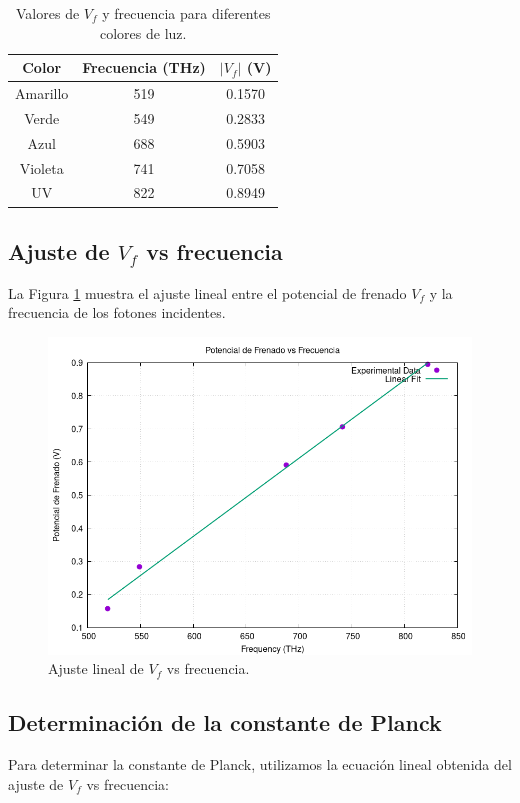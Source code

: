 \documentclass[twocolumn,a4paper,11pt]{scrartcl}
\begin{document}
\begin{table}[h]
\centering
\caption{Valores de $V_f$ y frecuencia para diferentes colores de luz.}
\label{tab:vf_frecuencia}
\begin{tabular}{|c|c|c|}
\hline
Color & Frecuencia (THz) & $|V_f|$ (V) \\
\hline
Amarillo & 519 & 0.1570 \\
Verde & 549 & 0.2833 \\
Azul & 688 & 0.5903 \\
Violeta & 741 & 0.7058 \\
UV & 822 & 0.8949 \\
\hline
\end{tabular}
\end{table}

\subsection{Ajuste de $V_f$ vs frecuencia}

La Figura \ref{fig:vf_vs_frecuencia} muestra el ajuste lineal entre el potencial de frenado $V_f$ y la frecuencia de los fotones incidentes.

\begin{figure}[h]
    \centering
    \includegraphics[width=0.8\linewidth]{vf_vs_frecuencia.png}
    \caption{Ajuste lineal de $V_f$ vs frecuencia.}
    \label{fig:vf_vs_frecuencia}
\end{figure}

\subsection{Determinación de la constante de Planck}

Para determinar la constante de Planck, utilizamos la ecuación lineal obtenida del ajuste de $V_f$ vs frecuencia:
\end{document}
